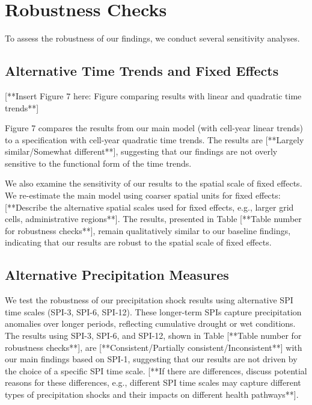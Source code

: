 \documentclass[12pt]{article}
\begin{document}
\section{Robustness Checks} \label{sec:robustness}

To assess the robustness of our findings, we conduct several sensitivity analyses.

\subsection{Alternative Time Trends and Fixed Effects}

[**Insert Figure 7 here: Figure comparing results with linear and quadratic time trends**]

Figure 7 compares the results from our main model (with cell-year linear trends) to a specification with cell-year quadratic time trends.  The results are [**Largely similar/Somewhat different**], suggesting that our findings are not overly sensitive to the functional form of the time trends.

We also examine the sensitivity of our results to the spatial scale of fixed effects.  We re-estimate the main model using coarser spatial units for fixed effects: [**Describe the alternative spatial scales used for fixed effects, e.g., larger grid cells, administrative regions**].  The results, presented in Table [**Table number for robustness checks**], remain qualitatively similar to our baseline findings, indicating that our results are robust to the spatial scale of fixed effects.

\subsection{Alternative Precipitation Measures}

We test the robustness of our precipitation shock results using alternative SPI time scales (SPI-3, SPI-6, SPI-12).  These longer-term SPIs capture precipitation anomalies over longer periods, reflecting cumulative drought or wet conditions.  The results using SPI-3, SPI-6, and SPI-12, shown in Table [**Table number for robustness checks**], are [**Consistent/Partially consistent/Inconsistent**] with our main findings based on SPI-1, suggesting that our results are not driven by the choice of a specific SPI time scale. [**If there are differences, discuss potential reasons for these differences, e.g., different SPI time scales may capture different types of precipitation shocks and their impacts on different health pathways**].
\end{document}
